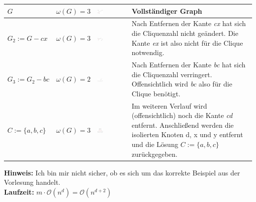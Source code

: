 \documentclass{article} %
\begin{document}
\begin{table}[!htp]
\centering
\begin{tabular}{|l|l|l|p{8cm}|}
\hline
$G$ &  $\omega (G) = 3$ & \includegraphics[width=0.2\textwidth,trim=0 0 0 -5]{img/clique1.png} &   Vollständiger Graph \\ \hline
$G_2 := G - cx$ &  $\omega (G) = 3$ & \includegraphics[width=0.2\textwidth,trim=0 0 0 -5]{img/clique2.png} & Nach Entfernen der Kante \emph{cx} hat sich die Cliquenzahl nicht geändert.
Die Kante \emph{ex} ist also nicht für die Clique notwendig. \\ \hline
$G_3 := G_2 - bc $  & $\omega (G) = 2$  & \includegraphics[width=0.2\textwidth,trim=0 0 0 -5]{img/clique4.png} & Nach Entfernen der Kante \emph{bc} hat sich die Cliquenzahl verringert.
 Offensichtlich wird \emph{bc} also für die Clique benötigt. \\ \hline
$C := \{a,b,c\} $  & $\omega (G) = 3$  & \includegraphics[width=0.2\textwidth,trim=0 0 0 -5]{img/clique3.png} & Im weiteren Verlauf wird (offensichtlich) noch die Kante \emph{cd} entfernt. Anschließend werden die isolierten Knoten d, x und y entfernt und die Lösung $C := \{a,b,c\}$ zurückgegeben.\\ \hline
\end{tabular}
\end{table}

\textbf{Hinweis:} Ich bin mir nicht sicher, ob es sich um das korrekte Beispiel aus der Vorlesung handelt.\\

\textbf{Laufzeit:} $m \cdot \mathcal{O}(n^d) = \mathcal{O}(n^{d+2})$
\end{document}
